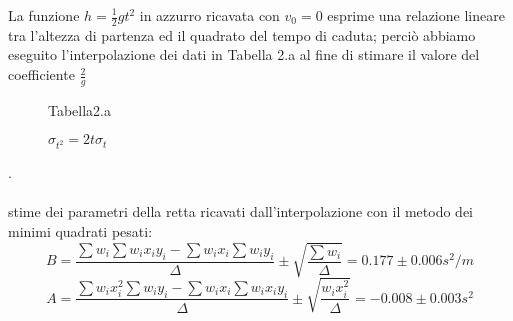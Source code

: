 \documentclass[a4paper]{article}
\theoremstyle{definition}
\begin{document}
\noindent La funzione \(h = \frac{1}{2}g t^{2}\) in azzurro ricavata con \(v_{0} = 0\) esprime una relazione lineare tra l'altezza di partenza ed il quadrato del tempo di caduta; perciò abbiamo eseguito l'interpolazione dei dati in Tabella 2.a al fine di stimare il valore del coefficiente \(\frac{2}{g}\)\\

\begin{figure}[!htbp]
	\captionsetup{labelformat=empty}
	\caption{Tabella2.a}
	\caption{\(\sigma_{t^{2}} = 2t\sigma_{t}\)}
\end{figure}
.\\\\
stime dei parametri della retta ricavati dall'interpolazione con il metodo dei minimi quadrati pesati:
\[B = \frac{\sum w_{i}\sum w_{i}x_{i}y_{i}-\sum w_{i}x_{i}\sum w_{i}y_{i}}{\Delta } \pm \sqrt{\frac{\sum w_{i}}{\Delta }} =0.177 \pm 0.006 s^{2}/m\]
\[A = \frac{\sum w_{i}x_{i}^{2}\sum w_{i}y_{i}-\sum w_{i}x_{i}\sum w_{i}x_{i}y_{i}}{\Delta } \pm \sqrt{\frac{w_{i}x_{i}^{2}}{\Delta }} = -0.008 \pm 0.003 s^{2}\]

\\

\begin{figure}[!ht]
	\captionsetup{labelformat=empty}
\end{figure}
\end{document}
